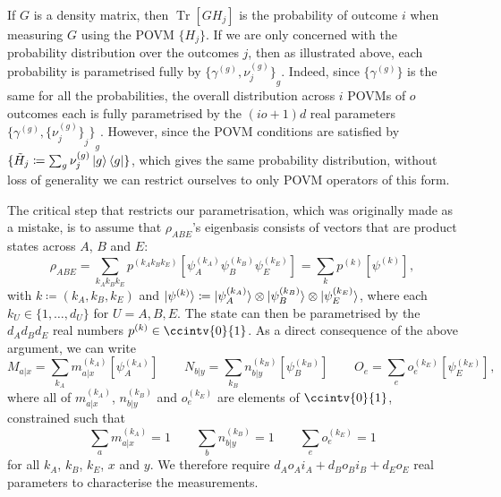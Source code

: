 \documentclass[10pt, a4paper]{article}
\numberwithin{equation}{section} %
\theoremstyle{definition}
\theoremstyle{plain}
\newcommand{\dintv}[2]{\mathopen\{#1,\ldots,#2\mathclose\}}
\newcommand{\?}{\mathrel{?}} %
\newcommand{\Tr}[2][]{\mathop{\mathrm{Tr}#1}\left[ #2 \right]} %
\newcommand{\proj}[2][]{{[#2]}_{#1}}
\begin{document}
\begin{appendices}
                            If \(G\) is a density matrix, then \(\Tr{GH_j}\) is the probability of outcome \(i\) when measuring \(G\) using the POVM \(\{H_j\}\). If we are only concerned with the probability distribution over the outcomes \(j\), then as illustrated above, each probability is parametrised fully by \({\{\gamma^{(g)}, \nu^{(g)}_j\}}_{g}\). Indeed, since \(\{\gamma^{(g)}\}\) is the same for all the probabilities, the overall distribution across \(i\) POVMs of \(o\) outcomes each is fully parametrised by the \((io+1)d\) real parameters \({\{\gamma^{(g)}, {\{\nu^{(g)}_j\}}_j \}}_{g}\). However, since the POVM conditions are satisfied by \(\{\tilde{H}_j \coloneqq \sum_g \nu^{(g)}_j \ket{g}\bra{g}\}\), which gives the same probability distribution, without loss of generality we can restrict ourselves to only POVM operators of this form.

                            The critical step that restricts our parametrisation, which was originally made as a mistake, is to assume that \(\rho_{ABE}\)'s eigenbasis consists of vectors that are product states across \(A\), \(B\) and \(E\):
                            \begin{equation}
                              \rho_{ABE} = \sum_{k_A k_B k_E} p^{(k_A k_B k_E)} \proj{\psi_A^{(k_A)} \psi_B^{(k_B)} \psi_E^{(k_E)}} = \sum_{k} p^{(k)} \proj{\psi^{(k)}},
                            \end{equation}
                            with \(k \coloneqq (k_A, k_B, k_E)\) and \(\ket{\psi^{(k)}} \coloneqq \ket{\psi_A^{(k_A)}} \otimes \ket{\psi_B^{(k_B)}} \otimes \ket{\psi_E^{(k_E)}}\), where each \(k_U \in \dintv{1}{d_U}\) for \(U = A,B,E\). The state can then be parametrised by the \(d_A d_B d_E\) real numbers \(p^{(k)} \in \ccintv{0}{1}\). As a direct consequence of the above argument, we can write
                            \begin{equation}
                              M_{a|x} = \sum_{k_A} m_{a|x}^{(k_A)} \proj{\psi_A^{(k_A)}} \qquad N_{b|y} = \sum_{k_B} n_{b|y}^{(k_B)} \proj{\psi_B^{(k_B)}} \qquad O_{e} = \sum_{e} o_{e}^{(k_E)} \proj{\psi_E^{(k_E)}},
                            \end{equation}
                            where all of \(m_{a|x}^{(k_A)}\), \(n_{b|y}^{(k_B)}\) and \(o_{e}^{(k_E)}\) are elements of \(\ccintv{0}{1}\), constrained such that
                            \begin{equation}
                              \sum_{a} m_{a|x}^{(k_A)} = 1 \qquad \sum_{b} n_{b|y}^{(k_B)} = 1 \qquad \sum_{e} o_e^{(k_E)} = 1
                            \end{equation}
                            for all \(k_A\), \(k_B\), \(k_E\), \(x\) and \(y\). We therefore require \(d_A o_A i_A + d_B o_B i_B + d_E o_E\) real parameters to characterise the measurements.


\end{appendices}
\end{document}

